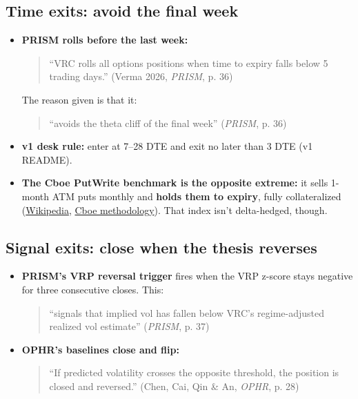 \documentclass{article}
\begin{document}
\subsection{Time exits: avoid the final week}

\begin{itemize}

\item \textbf{PRISM rolls before the last week:}

\begin{quote}``VRC rolls all options positions when time to expiry falls below 5 trading days.'' (Verma 2026, \emph{PRISM}, p. 36)\end{quote}

The reason given is that it:

\begin{quote}``avoids the theta cliff of the final week'' (\emph{PRISM}, p. 36)\end{quote}

\item \textbf{v1 desk rule:} enter at 7--28 DTE and exit no later than 3 DTE (v1 README).

\item \textbf{The Cboe PutWrite benchmark is the opposite extreme:} it sells 1-month ATM puts monthly and \textbf{holds them to expiry}, fully collateralized (\href{https://en.wikipedia.org/wiki/CBOE_S\&P_500_PutWrite_Index}{Wikipedia}, \href{https://cdn.cboe.com/api/global/us_indices/governance/Cboe_SP_500_PutWrite_Indices_Methodology.pdf}{Cboe methodology}). That index isn't delta-hedged, though.

\end{itemize}

\subsection{Signal exits: close when the thesis reverses}

\begin{itemize}

\item \textbf{PRISM's VRP reversal trigger} fires when the VRP z-score stays negative for three consecutive closes. This:

\begin{quote}``signals that implied vol has fallen below VRC's regime-adjusted realized vol estimate'' (\emph{PRISM}, p. 37)\end{quote}

\item \textbf{OPHR's baselines close and flip:}

\begin{quote}``If predicted volatility crosses the opposite threshold, the position is closed and reversed.'' (Chen, Cai, Qin \& An, \emph{OPHR}, p. 28)\end{quote}

\end{itemize}
\end{document}
